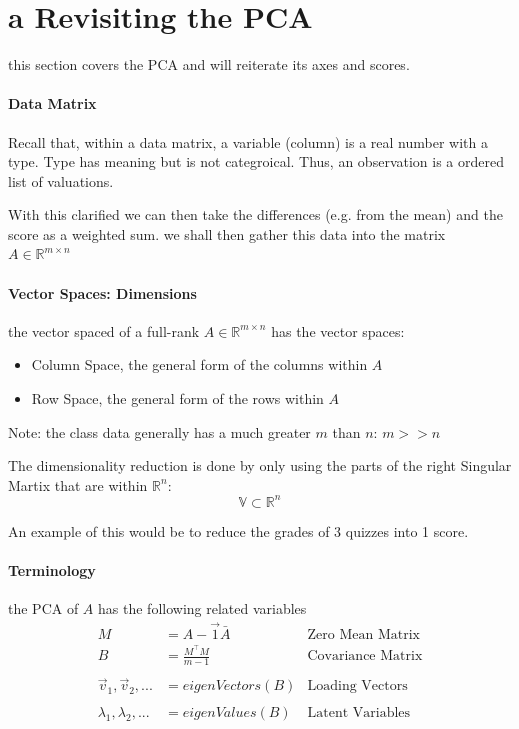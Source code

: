 \documentclass[12pt]{book}
\title{\coursetitle\linebreak\lecturename}
\author{\\Cain Susko\\ 
           \\ \\ \\
      Queen's University 
    \\School of Computing\\}
\begin{document}
\begin{titlepage}
        \maketitle
\end{titlepage}


\section*{a Revisiting the PCA}
this section covers the PCA and will reiterate its axes and scores. 

\paragraph{Data Matrix}
Recall that, within a data matrix, a variable (column) is a real number
with a type. Type has meaning but is not categroical. Thus, an observation is
a ordered list of valuations.

With this clarified we can then take the differences (e.g. from the mean) and the
score as a weighted sum. we shall then gather this data into the matrix
$A \in \mathbb{R}^{m \times n}$

\paragraph{Vector Spaces: Dimensions}
the vector spaced of a full-rank $A \in \mathbb{R}^{m \times n}$ has the 
vector spaces:
\begin{itemize}
        \item Column Space, the general form of the columns within $A$
        \item Row Space, the general form of the rows within $A$
\end{itemize}
Note: the class data generally has a much greater $m$ than $n$: $m >> n$

The dimensionality reduction is done by only using the parts of the right
Singular Martix that are within $\mathbb{R}^n$: 
\[\mathbb{V} \subset \mathbb{R}^n\]

An example of this would be to reduce the grades of 3 quizzes into 1 score.

\paragraph{Terminology}
the PCA of $A$ has the following related variables
\begin{align*}
        M &= A - \vec 1 \bar A &\text{Zero Mean Matrix}\\
        B &= \frac{M^\top M}{m-1} &\text{Covariance Matrix}\\
        \\
        \vec v_1, \vec v_2, ... &= eigenVectors(B) &\text{Loading Vectors}\\
        \\
        \lambda_1, \lambda_2,... &= eigenValues(B) &\text{Latent Variables}
\end{align*}
\end{document}
